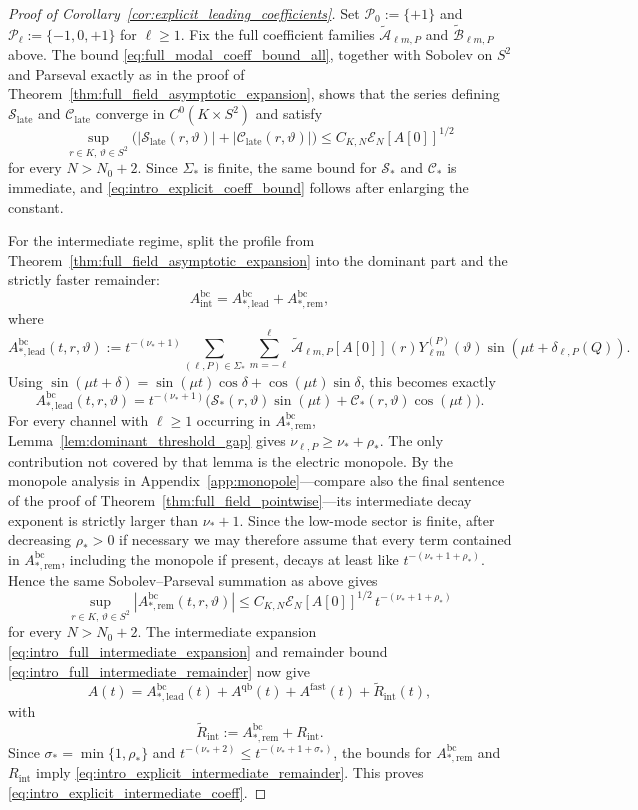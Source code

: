 \documentclass[12pt]{article}
\numberwithin{equation}{section}
\theoremstyle{plain}
\theoremstyle{definition}
\theoremstyle{remark}
\newcommand{\bc}{\mathrm{bc}}
\newcommand{\qb}{\mathrm{qb}}
\newcommand{\fast}{\mathrm{fast}}
\newcommand{\cC}{\mathcal C}
\newcommand{\cS}{\mathcal S}
\newcommand{\abs}[1]{\left|#1\right|}
\begin{document}
\begin{proof}[Proof of Corollary~\ref{cor:explicit_leading_coefficients}]
Set $\mathcal P_0:=\{+1\}$ and $\mathcal P_\ell:=\{-1,0,+1\}$ for $\ell\ge1$.
Fix the full coefficient families $\widetilde{\mathcal A}_{\ell m,P}$ and $\widetilde{\mathcal B}_{\ell m,P}$ above.  The bound \eqref{eq:full_modal_coeff_bound_all}, together with Sobolev on $S^2$ and Parseval exactly as in the proof of Theorem~\ref{thm:full_field_asymptotic_expansion}, shows that the series defining $\cS_{\mathrm{late}}$ and $\cC_{\mathrm{late}}$ converge in $C^0(K\times S^2)$ and satisfy
\[
   \sup_{r\in K,\,\vartheta\in S^2}
   \bigl(
      \abs{\cS_{\mathrm{late}}(r,\vartheta)}
      +
      \abs{\cC_{\mathrm{late}}(r,\vartheta)}
   \bigr)
   \le
   C_{K,N}\mathcal E_N[A[0]]^{1/2}
\]
for every $N>N_0+2$.  Since $\Sigma_*$ is finite, the same bound for $\cS_*$ and $\cC_*$ is immediate, and \eqref{eq:intro_explicit_coeff_bound} follows after enlarging the constant.

For the intermediate regime, split the profile from Theorem~\ref{thm:full_field_asymptotic_expansion} into the dominant part and the strictly faster remainder:
\[
   A^{\bc}_{\mathrm{int}}
   =
   A^{\bc}_{*,\mathrm{lead}}
   +
   A^{\bc}_{*,\mathrm{rem}},
\]
where
\[
   A^{\bc}_{*,\mathrm{lead}}(t,r,\vartheta)
   :=
   t^{-(\nu_*+1)}
   \sum_{(\ell,P)\in\Sigma_*}\sum_{m=-\ell}^{\ell}
   \widetilde{\mathcal A}_{\ell m,P}[A[0]](r)
   Y_{\ell m}^{(P)}(\vartheta)
   \sin(\mu t+\delta_{\ell,P}(Q)).
\]
Using $\sin(\mu t+\delta)=\sin(\mu t)\cos\delta+\cos(\mu t)\sin\delta$, this becomes exactly
\[
   A^{\bc}_{*,\mathrm{lead}}(t,r,\vartheta)
   =
   t^{-(\nu_*+1)}
   \bigl(
      \cS_*(r,\vartheta)\sin(\mu t)
      +
      \cC_*(r,\vartheta)\cos(\mu t)
   \bigr).
\]
For every channel with $\ell\ge1$ occurring in $A^{\bc}_{*,\mathrm{rem}}$, Lemma~\ref{lem:dominant_threshold_gap} gives $\nu_{\ell,P}\ge\nu_*+\rho_*$.  The only contribution not covered by that lemma is the electric monopole.  By the monopole analysis in Appendix~\ref{app:monopole}---compare also the final sentence of the proof of Theorem~\ref{thm:full_field_pointwise}---its intermediate decay exponent is strictly larger than $\nu_*+1$.  Since the low-mode sector is finite, after decreasing $\rho_*>0$ if necessary we may therefore assume that every term contained in $A^{\bc}_{*,\mathrm{rem}}$, including the monopole if present, decays at least like $t^{-(\nu_*+1+\rho_*)}$.  Hence the same Sobolev--Parseval summation as above gives
\[
   \sup_{r\in K,\,\vartheta\in S^2}
   \abs{A^{\bc}_{*,\mathrm{rem}}(t,r,\vartheta)}
   \le
   C_{K,N}\mathcal E_N[A[0]]^{1/2}\,
   t^{-(\nu_*+1+\rho_*)}
\]
for every $N>N_0+2$.  The intermediate expansion \eqref{eq:intro_full_intermediate_expansion} and remainder bound \eqref{eq:intro_full_intermediate_remainder} now give
\[
   A(t)
   =
   A^{\bc}_{*,\mathrm{lead}}(t)
   +A^{\qb}(t)+A^{\fast}(t)
   +\widetilde R_{\mathrm{int}}(t),
\]
with
\[
   \widetilde R_{\mathrm{int}}
   :=
   A^{\bc}_{*,\mathrm{rem}}+R_{\mathrm{int}}.
\]
Since $\sigma_*=\min\{1,\rho_*\}$ and $t^{-(\nu_*+2)}\le t^{-(\nu_*+1+\sigma_*)}$, the bounds for $A^{\bc}_{*,\mathrm{rem}}$ and $R_{\mathrm{int}}$ imply \eqref{eq:intro_explicit_intermediate_remainder}.  This proves \eqref{eq:intro_explicit_intermediate_coeff}.


\end{proof}
\end{document}
